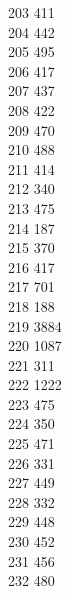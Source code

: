 { 203	411 \\
 204	442 \\
 205	495 \\
 206	417 \\
 207	437 \\
 208	422 \\
 209	470 \\
 210	488 \\
 211	414 \\
 212	340 \\
 213	475 \\
 214	187 \\
 215	370 \\
 216	417 \\
 217	701 \\
 218	188 \\
 219	3884 \\
 220	1087 \\
 221	311 \\
 222	1222 \\
 223	475 \\
 224	350 \\
 225	471 \\
 226	331 \\
 227	449 \\
 228	332 \\
 229	448 \\
 230	452 \\
 231	456 \\
 232	480 \\
}
